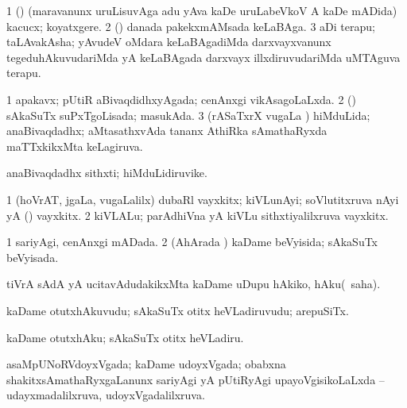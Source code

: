 {\bentry
{} 
\gl{\nA}
\expl{}
\bmng
\bnum
\num{1} (\ame) (maravanunx uruLisuvAga adu yAva kaDe uruLabeVkoV A kaDe mADida) kacucx; koyatxgere. 
\num{2} (\birx) danada pakekxmAMsada keLaBAga. 
\num{3} aDi terapu; taLAvakAsha; yAvudeV oMdara keLaBAgadiMda darxvayxvanunx tegeduhAkuvudariMda yA keLaBAgada darxvayx illxdiruvudariMda uMTAguva terapu. 
\enum
\emng
\eentry

\bentry
{} 
\gl{\gu}
\expl{}
\bmng
\bnum
\num{1} apakavx; pUtiR aBivaqdidhxyAgada; cenAnxgi vikAsagoLaLxda. 
\num{2} (\CA) sAkaSuTx suPxTgoLisada; masukAda. 
\num{3} (rASaTxrX \mo vugaLa \vi) hiMduLida; anaBivaqdadhx; aMtasathxvAda tananx AthiRka sAmathaRyxda maTTxkikxMta keLagiruva. 
\enum
\emng
\eentry

\bentry
{} 
\gl{\nA}
\expl{}
\bmng
 anaBivaqdadhx sithxti; hiMduLidiruvike. 
\emng
\eentry

\bentry
{} 
\gl{\nA}
\expl{}
\bmng
\bnum
\num{1} (hoVrAT, jgaLa, \mo vugaLalilx) dubaRl vayxkitx; kiVLunAyi; soVlutitxruva nAyi yA (\sA) vayxkitx. 
\num{2} kiVLALu; parAdhiVna yA kiVLu sithxtiyalilxruva vayxkitx. 
\enum
\emng
\eentry

\bentry
{} 
\gl{\gu}
\expl{}
\bmng
\bnum
\num{1} sariyAgi, cenAnxgi mADada. 
\num{2} (AhArada \vi) kaDame beVyisida; sAkaSuTx beVyisada. 
\enum
\emng
\eentry

\bentry
{} 
\gl{\sakirx}
\expl{}
\bmng
 tiVrA sAdA yA ucitavAdudakikxMta kaDame uDupu hAkiko, hAku(\akirx\ saha). 
\emng
\eentry

\bentry
{} 
\gl{\nA}
\bmng
 kaDame otutxhAkuvudu; sAkaSuTx otitx heVLadiruvudu; arepuSiTx. 
\emng
\eentry

\bentry
{} 
\gl{\sakirx}
\expl{}
\bmng
\emng
\eentry

\bentry
{} 
\gl{\akirx}
\expl{}
\bmng
 kaDame otutxhAku; sAkaSuTx otitx heVLadiru. 
\emng
\eentry

\bentry
{} 
\gl{\gu}
\expl{}
\bmng
 asaMpUNoRVdoyxVgada; kaDame udoyxVgada; obabxna shakitxsAmathaRyxgaLanunx sariyAgi yA pUtiRyAgi upayoVgisikoLaLxda -- udayxmadalilxruva, udoyxVgadalilxruva. 
\emng
\eentry

}
